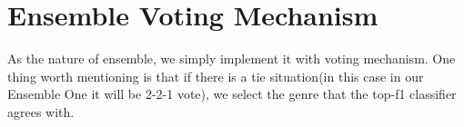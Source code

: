 \section{Ensemble Voting Mechanism}



As the nature of ensemble, we simply implement it with voting mechanism. One thing worth mentioning is that if there is a tie situation(in this case in our Ensemble One it will be 2-2-1 vote), we select the genre that the top-f1 classifier agrees with.